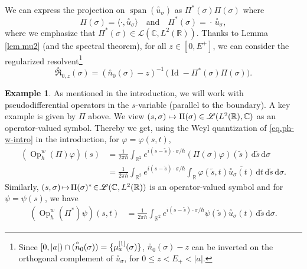 \documentclass[10pt]{amsart}
\newcommand\mto{\mathchoice{\longmapsto}{\mapsto}{\mapsto}{\mapsto}}
\newcommand{\rd}{\,\mathrm{d}}
\DeclareMathOperator{\Id}{Id}
\DeclareMathOperator{\Op}{Op}
\let\sp\relax
\DeclareMathOperator{\sp}{sp}
\DeclareMathOperator{\Span}{span}
\theoremstyle{plain}
\theoremstyle{definition}
\newtheorem{example}[theorem]{Example}
\newcommand{\R}{\mathbb{R}}
\newcommand{\C}{\mathbb{C}}
\begin{document}
We can express the projection on $\Span(\overset{\circ}{u}_\sigma)$ as $ \Pi^*(\sigma)\Pi(\sigma)$ where
\[
\Pi(\sigma)=\langle\cdot,\overset{\circ}{u}_{\sigma}\rangle\quad\text{and}\quad \Pi^*(\sigma)={}\cdot\, \overset{\circ}{u}_{\sigma},
\]
where we emphasize that $\Pi^*(\sigma)\in\mathcal L (\mathbb C, L^2(\mathbb R))$.
Thanks to Lemma \ref{lem.mu2} (and the spectral theorem), for all $z\in [0,E^+]$, we can consider the regularized resolvent\footnote{Since $[0,|a|)\cap\sp(\overset{\circ}{n}_0(\sigma))=\{\mu_a^{[1]}(\sigma)\}$, $\overset{\circ}{n}_0(\sigma)-z$ can be inverted on the orthogonal complement of $\overset{\circ}{u}_\sigma$, for $0\leq z<E_+<|a|$.}
\[
\overset{\circ}{\mathfrak R}_{0,z}(\sigma)= (\overset{\circ}{n}_0(\sigma)-z)^{-1}\,\bigl(\Id-\Pi^*(\sigma)\Pi(\sigma)\bigr).
\]

\begin{example}
As mentioned in the introduction, we will work with pseudodifferential operators in the $s$-variable (parallel to the boundary).
A key example is given by $\Pi$ above. We view $(s,\sigma) \mto \Pi(\sigma) \in \mathscr{L}(L^2(\R),\C)$ as an operator-valued symbol.
Thereby we get, using the Weyl quantization of \eqref{eq.ph-w-intro} in the introduction, for $\varphi=\varphi(s,t)$,
\begin{align*}
(\Op_\hbar^w(\Pi) \varphi)(s)&=\frac{1}{2\pi\hbar} \int_{\R^2} e^{i(s-\tilde s)\cdot \sigma/\hbar} (\Pi(\sigma) \varphi)(\tilde s) \rd \tilde s \rd \sigma \\
&= \frac{1}{2\pi\hbar} \int_{\R^2} e^{i(s-\tilde s)\cdot \sigma/\hbar} \int_{\R} \varphi(\tilde s,t) \overline{\overset{\circ}{u}_\sigma(t)} \rd t \rd \tilde s \rd \sigma.
\end{align*}
Similarly, $(s,\sigma) \!\mto\! \Pi(\sigma)^{*} \!\in\! \mathscr{L}(\C,L^2(\R))$ is an operator-valued symbol and for \hbox{$\psi\!=\!\psi(s)$}, we have\vspace*{-3pt}
\begin{align*}
(\Op_\hbar^w(\Pi^{*}) \psi)(s,t)
&= \frac{1}{2\pi\hbar} \int_{\R^2} e^{i(s-\tilde s)\cdot \sigma/\hbar}\psi(\tilde s) \overset{\circ}{u}_\sigma(t) \rd \tilde s \rd \sigma.
\end{align*}
\end{example}
\end{document}
